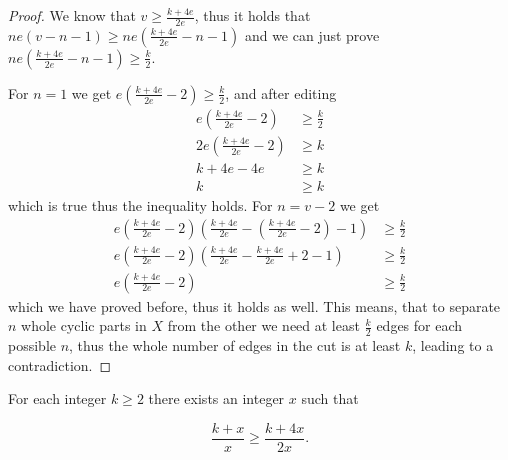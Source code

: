 \documentclass[12pt, twoside]{book}
\begin{document}
\begin{proof}
	We know that $v\geq \frac{k+4e}{2e}$, thus it holds that $ne(v-n-1)\geq ne(\frac{k+4e}{2e}-n-1)$ and we can just prove $ne(\frac{k+4e}{2e}-n-1)\geq \frac{k}{2}$.
	
	For $n=1$ we get $e(\frac{k+4e}{2e}-2)\geq \frac{k}{2}$, and after editing
	\begin{align*}
		e\left(\frac{k+4e}{2e}-2\right)&\geq \frac{k}{2} \\
		2e\left(\frac{k+4e}{2e}-2\right)&\geq k \\
		k+4e-4e&\geq k \\
		k&\geq k
	\end{align*}
	which is true thus the inequality holds. For $n=v-2$ we get
	\begin{align*}
		e\left(\frac{k+4e}{2e}-2\right)\left(\frac{k+4e}{2e}-\left(\frac{k+4e}{2e}-2\right)-1\right)&\geq \frac{k}{2} \\
		e\left(\frac{k+4e}{2e}-2\right)\left(\frac{k+4e}{2e}-\frac{k+4e}{2e}+2-1\right)&\geq \frac{k}{2} \\
		e\left(\frac{k+4e}{2e}-2\right)&\geq \frac{k}{2}
	\end{align*}
	which we have proved before, thus it holds as well. This means, that to separate $n$ whole cyclic parts in $X$ from the other we need at least $\frac{k}{2}$ edges for each possible $n$, thus the whole number of edges in the cut is at least $k$, leading to a contradiction.
\end{proof}


\begin{lemma}
	For each integer $k\geq 2$ there exists an integer $x$ such that
	
	$$\dfrac{k+x}{x}\geq \dfrac{k+4x}{2x}.$$
	
\end{lemma}
\end{document}
